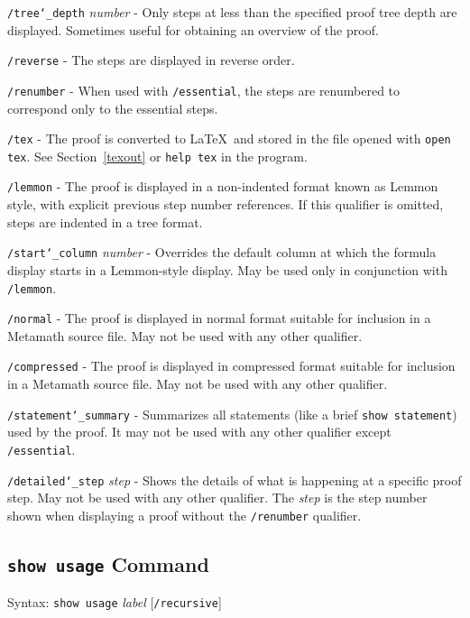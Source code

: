     \texttt{/tree{\char`\_}depth} {\em number} - Only
         steps at less than the specified proof
        tree depth are displayed.  Sometimes useful for obtaining an overview of
        the proof.

    \texttt{/reverse} - The steps are displayed in reverse order.

    \texttt{/renumber} - When used with \texttt{/essential}, the steps are renumbered
        to correspond only to the essential steps.

    \texttt{/tex} - The proof is converted to \LaTeX\ and
        stored in the file opened
        with \texttt{open tex}.  See Section~\ref{texout} or
        \texttt{help tex} in the program.

    \texttt{/lemmon} - The proof is displayed in a non-indented format known
        as Lemmon style, with explicit previous step number references.
        If this qualifier is omitted, steps are indented in a tree format.

    \texttt{/start{\char`\_}column} {\em number} - Overrides the default column
        at which the formula display starts in a Lemmon-style display.  May be
        used only in conjunction with \texttt{/lemmon}.

    \texttt{/normal} - The proof is displayed in normal format suitable for
        inclusion in a Metamath source file.  May not be used with any other
        qualifier.

    \texttt{/compressed} - The proof is displayed in compressed format
        suitable for inclusion in a Metamath source file.  May not be used with
        any other qualifier.

    \texttt{/statement{\char`\_}summary} - Summarizes all statements (like a
        brief \texttt{show statement})
        used by the proof.  It may not be used with any other qualifier
        except \texttt{/essential}.

    \texttt{/detailed{\char`\_}step} {\em step} - Shows the details of what is
        happening at
        a specific proof step.  May not be used with any other qualifier.
        The {\em step} is the step number shown when displaying a
        proof without the \texttt{/renumber} qualifier.


\subsection{\texttt{show usage} Command}
Syntax:  \texttt{show usage} {\em label} [\texttt{/recursive}]

